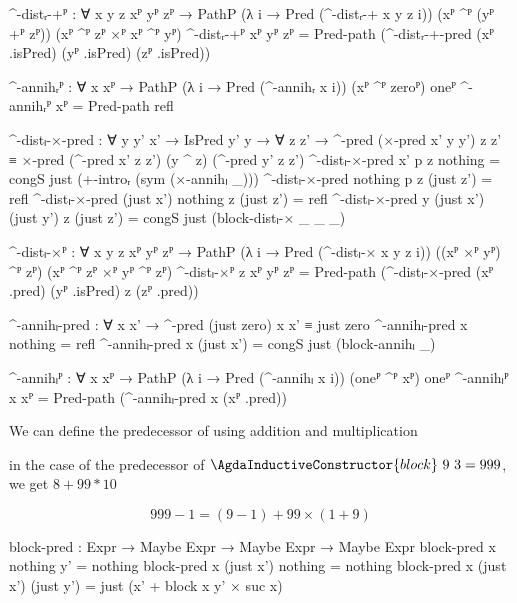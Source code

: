 \begin{code}[hide]
  ^-distᵣ-+ᴾ :
    ∀ {x y z} xᴾ yᴾ zᴾ →
    PathP (λ i → Pred (^-distᵣ-+ x y z i))
      (xᴾ ^ᴾ (yᴾ +ᴾ zᴾ)) (xᴾ ^ᴾ zᴾ ×ᴾ xᴾ ^ᴾ yᴾ)
  ^-distᵣ-+ᴾ xᴾ yᴾ zᴾ =
    Pred-path (^-distᵣ-+-pred (xᴾ .isPred) (yᴾ .isPred) (zᴾ .isPred))

  ^-annihᵣᴾ : ∀ {x} xᴾ → PathP (λ i → Pred (^-annihᵣ x i)) (xᴾ ^ᴾ zeroᴾ) oneᴾ
  ^-annihᵣᴾ xᴾ = Pred-path refl

  ^-distₗ-×-pred :
    ∀ {y y'} x' → IsPred y' y → ∀ z z' →
    ^-pred (×-pred x' y y') z z' ≡
    ×-pred (^-pred x' z z') (y ^ z) (^-pred y' z z')
  ^-distₗ-×-pred x' p z nothing = congS just (+-introᵣ (sym (×-annihₗ _)))
  ^-distₗ-×-pred nothing p z (just z') = refl
  ^-distₗ-×-pred (just x') nothing z (just z') = refl
  ^-distₗ-×-pred {y} (just x') (just y') z (just z') =
    congS just (block-distₗ-× _ _ _)

  ^-distₗ-×ᴾ :
    ∀ {x y z} xᴾ yᴾ zᴾ →
    PathP (λ i → Pred (^-distₗ-× x y z i))
      ((xᴾ ×ᴾ yᴾ) ^ᴾ zᴾ) (xᴾ ^ᴾ zᴾ ×ᴾ yᴾ ^ᴾ zᴾ)
  ^-distₗ-×ᴾ {z} xᴾ yᴾ zᴾ =
    Pred-path (^-distₗ-×-pred (xᴾ .pred) (yᴾ .isPred) z (zᴾ .pred))

  ^-annihₗ-pred : ∀ x x' → ^-pred (just zero) x x' ≡ just zero
  ^-annihₗ-pred x nothing = refl
  ^-annihₗ-pred x (just x') = congS just (block-annihₗ _)

  ^-annihₗᴾ : ∀ {x} xᴾ → PathP (λ i → Pred (^-annihₗ x i)) (oneᴾ ^ᴾ xᴾ) oneᴾ
  ^-annihₗᴾ {x} xᴾ = Pred-path (^-annihₗ-pred x (xᴾ .pred))
\end{code}
We can define the predecessor of  using addition
and multiplication

in the case of the predecessor of $\AgdaInductiveConstructor{block}\ 9\ 3 =
999$, we get $8 + 99 * 10$

\[999-1 = (9-1) + 99 \times (1+9)\]
\begin{code}
  block-pred :
    Expr → Maybe Expr → Maybe Expr → Maybe Expr
  block-pred x nothing    y'         = nothing
  block-pred x (just x')  nothing    = nothing
  block-pred x (just x')  (just y')  =
    just (x' + block x y' × suc x)
\end{code}

